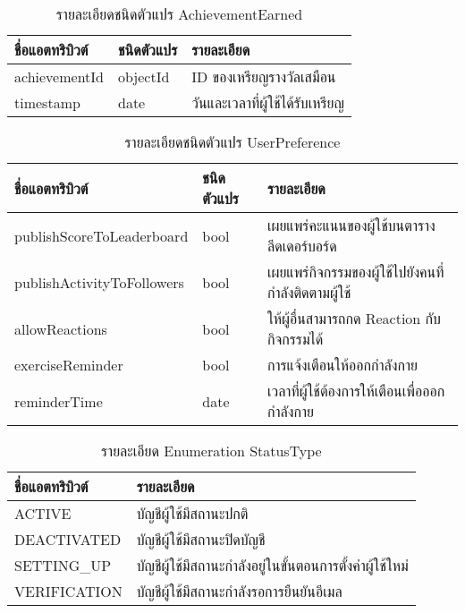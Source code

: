 \begin{table}
    \caption{รายละเอียดชนิดตัวแปร AchievementEarned}
    \begin{tabularx}{\textwidth}{ | l | l | X | }
        \hline
        \bf ชื่อแอตทริบิวต์ & \bf ชนิดตัวแปร & \bf รายละเอียด \\\hline
        achievementId & objectId & ID ของเหรียญรางวัลเสมือน\\\hline
        timestamp & date & วันและเวลาที่ผู้ใช้ได้รับเหรียญ\\\hline 
    \end{tabularx}
\end{table}

\begin{table}
    \caption{รายละเอียดชนิดตัวแปร UserPreference}
    \begin{tabularx}{\textwidth}{ | l | l | X | }
        \hline
        \bf ชื่อแอตทริบิวต์ & \bf ชนิดตัวแปร & \bf รายละเอียด \\\hline
        publishScoreToLeaderboard & bool & เผยแพร่คะแนนของผู้ใช้บนตารางลีดเดอร์บอร์ด\\\hline
        publishActivityToFollowers & bool & เผยแพร่กิจกรรมของผู้ใช้ไปยังคนที่กำลังติดตามผู้ใช้\\\hline
        allowReactions & bool & ให้ผู้อื่นสามารถกด Reaction กับกิจกรรมได้\\\hline
        exerciseReminder & bool & การแจ้งเตือนให้ออกกำลังกาย\\\hline
        reminderTime & date & เวลาที่ผู้ใช้ต้องการให้เตือนเพื่อออกกำลังกาย\\\hline
    \end{tabularx}
\end{table}

\begin{table}
    \caption{รายละเอียด Enumeration StatusType}
    \begin{tabularx}{\textwidth}{ | l | X | }
        \hline
        \bf ชื่อแอตทริบิวต์ & \bf รายละเอียด \\\hline
        ACTIVE & บัญชีผู้ใช้มีสถานะปกติ\\\hline
        DEACTIVATED & บัญชีผู้ใช้มีสถานะปิดบัญชี\\\hline
        SETTING\_UP & บัญชีผู้ใช้มีสถานะกำลังอยู่ในขั้นตอนการตั้งค่าผู้ใช้ใหม่\\\hline
        VERIFICATION & บัญชีผู้ใช้มีสถานะกำลังรอการยืนยันอีเมล\\\hline
    \end{tabularx}
\end{table}

